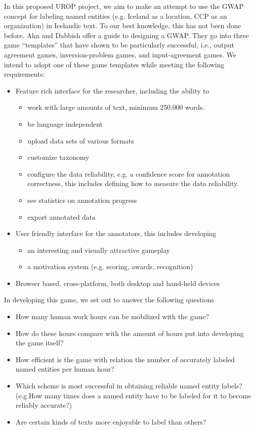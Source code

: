 \documentclass[11pt]{article}
\begin{document}
In this proposed UROP project, we aim to make an attempt to use the GWAP
concept for labeling named entities (e.g. Iceland as a location, CCP as an organization) in Icelandic text. To our best knowledge,
this has not been done before. Ahn and Dabbish  offer a guide
to designing a GWAP. They go into three game “templates” that have shown to be
particularly successful, i.e.\@, output agreement games, inversion-problem
games, and input-agreement games. We intend to adopt one of these game
templates while meeting the following requirements:
\begin{itemize}
    \item Feature rich interface for the researcher, including the ability to
        \begin{itemize}
            \item work with large amounts of text, minimum 250.000 words.
            \item be language independent
            \item upload data sets of various formats
            \item customize taxonomy
            \item configure the data reliability, e.g. a confidence score for
                annotation correctness, this includes defining how to measure
                the data reliability.
            \item see statistics on annotation progress
            \item export annotated data
        \end{itemize}
    \item User friendly interface for the annotators, this includes
        developing
        \begin{itemize}
            \item an interesting and visually attractive gameplay
            \item a motivation system (e.g. scoring, awards, recognition)
        \end{itemize}
    \item Browser based, cross-platform, both desktop and hand-held devices
\end{itemize}

In developing this game, we set out to answer the following questions
\begin{itemize}
    \item How many human work hours can be mobilized with the game?
    \item How do these hours compare with the amount of hours put into
        developing the game itself?
    \item How efficient is the game with relation the number of accurately
        labeled named entities per human hour?
    \item Which scheme is most successful in obtaining reliable named entity
        labels? (e.g.\@  How many times does a named entity have to be labeled
        for it to become reliably accurate?)
    \item Are certain kinds of texts more enjoyable to label than others?
\end{itemize}
\end{document}
